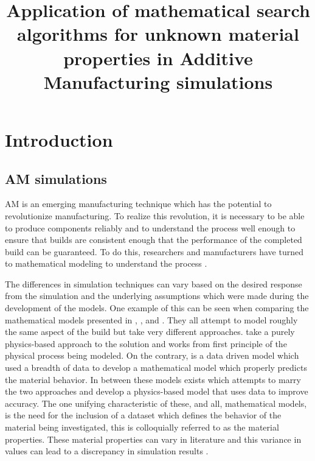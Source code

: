 \documentclass[pdflatex,sn-mathphys]{sn-jnl}
\title[Searching for unknown material properties for AM simulations]{Application of mathematical search algorithms for unknown material properties in Additive Manufacturing simulations}
\begin{document}
\maketitle

\section{Introduction}
	\subsection{\Acf{AM} simulations}
	\label{introAMsim}

	\Acf{AM} is an emerging manufacturing technique which has the potential to revolutionize manufacturing.  To realize this revolution, it is necessary to be able to produce components reliably and to understand the process well enough to ensure that builds are consistent enough that the performance of the completed build can be guaranteed.  To do this, researchers and manufacturers have turned to mathematical modeling to understand the process \cite{wangClosedLoopHighFidelitySimulation2021}.
	
	The differences in simulation techniques can vary based on the desired response from the simulation and the underlying assumptions which were made during the development of the models.
	One example of this can be seen when comparing the mathematical models presented in \cite{wangClosedLoopHighFidelitySimulation2021}, \cite{royDatadrivenModelingThermal2020}, and \cite{mogesHYBRIDMODELINGAPPROACH2020}.  They all attempt to model roughly the same aspect of the build but take very different approaches.
	\cite{wangClosedLoopHighFidelitySimulation2021} take a purely physics-based approach to the solution and works from first principle of the physical process being modeled.
	On the contrary, \cite{royDatadrivenModelingThermal2020} is a data driven model which used a breadth of data to develop a mathematical model which properly predicts the material behavior. 
	In between these models exists \cite{mogesHYBRIDMODELINGAPPROACH2020} which attempts to marry the two approaches and develop a physics-based model that uses data to improve accuracy.
	The one unifying characteristic of these, and all, mathematical models, is the need for the inclusion of a dataset which defines the behavior of the material being investigated, this is colloquially referred to as the material properties.  These material properties can vary in literature and this variance in values can lead to a discrepancy in simulation results \cite{Daryabeigi2011}.
	
\end{document}
